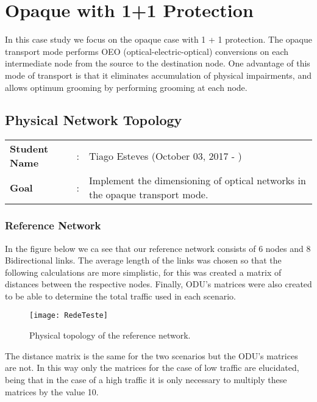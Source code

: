 \clearpage

\section{Opaque with 1+1 Protection}
In this case study we focus on the opaque case with 1 + 1 protection.
The opaque transport mode performs OEO (optical-electric-optical) conversions on each intermediate node from the source to the destination node.
One advantage of this mode of transport is that it eliminates accumulation of physical impairments, and allows optimum grooming by performing grooming at each node.

\subsection{Physical Network Topology}
\begin{tcolorbox}	
\begin{tabular}{p{2.75cm} p{0.2cm} p{10.5cm}} 	
\textbf{Student Name}  &:& Tiago Esteves    (October 03, 2017 - )\\
\textbf{Goal}          &:& Implement the dimensioning of optical networks in the opaque transport mode.
\end{tabular}
\end{tcolorbox}
\vspace{-5pt}

\subsubsection{Reference Network}
In the figure below we ca see that our reference network consists of 6 nodes and 8 Bidirectional links.
The average length of the links was chosen so that the following calculations are more simplistic, for this was created a matrix of distances between the respective nodes.
Finally, ODU's matrices were also created to be able to determine the total traffic used in each scenario.

\begin{figure}[h!]
\centering
\texttt{[image: RedeTeste]}
\caption{Physical topology of the reference network.}
\end{figure}

The distance matrix is the same for the two scenarios but the ODU's matrices are not.
In this way only the matrices for the case of low traffic are elucidated, being that in the case of a high traffic it is only necessary to multiply these matrices by the value 10.

